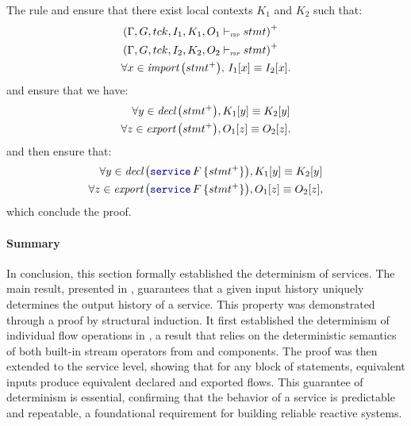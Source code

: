 \begin{skippableproof}
    The rule  and  ensure that there exist local contexts $K_1$ and $K_2$ such
    that:
    \begin{align*}
         & \left(\stmtDenot{\tck}{I_1}{K_1}{stmt}{O_1}\right)^+       \\
         & \left(\stmtDenot{\tck}{I_2}{K_2}{stmt}{O_2}\right)^+       \\
         & \forall x \in \importSet{stmt^+}, \, I_1[x] \equiv I_2[x].
    \end{align*}
     and  ensure that we have:
    \begin{align*}
        \forall y \in \declSet{stmt^+},   & \, K_1[y] \equiv K_2[y]  \\
        \forall z \in \exportSet{stmt^+}, & \, O_1[z] \equiv O_2[z].
    \end{align*}
     and  then ensure that:
    \begin{align*}
        \forall y \in \declSet{\service{F}{stmt^+}},   & \, K_1[y] \equiv K_2[y]  \\
        \forall z \in \exportSet{\service{F}{stmt^+}}, & \, O_1[z] \equiv O_2[z],
    \end{align*}
    which conclude the proof.
\end{skippableproof}

\paragraph{Summary}
In conclusion, this section formally established the determinism of \GRFRP services. The main
result, presented in , guarantees that a given input
history uniquely determines the output history of a service.
%
This property was demonstrated through a proof by structural induction. It first established the
determinism of individual flow operations in , a
result that relies on the deterministic semantics of both built-in stream operators from \GReact
and \GRSync components.
%
The proof was then extended to the service level, showing that for any block of statements,
equivalent inputs produce equivalent declared and exported flows.
%
This guarantee of determinism is essential, confirming that the behavior of a service is predictable
and repeatable, a foundational requirement for building reliable reactive systems.
